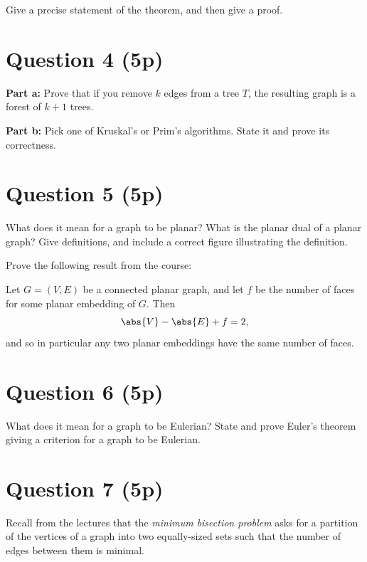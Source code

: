 \documentclass[nobib]{tufte-handout}
\begin{document}
Give a precise statement of the theorem, and then give a proof.

\section{Question 4 (5p)} %
\textbf{Part a:} Prove that if you remove $k$ edges from a tree $T$, the resulting graph is a forest of $k+1$ trees.
\vspace{0.5cm}

\noindent
\textbf{Part b:} Pick one of Kruskal's or Prim's algorithms. State it and prove its correctness.

\section{Question 5 (5p)} %

What does it mean for a graph to be planar? What is the planar dual of a planar graph? Give definitions, and include a correct figure illustrating the definition.

Prove the following result from the course:
\begin{theorem}
  Let $G = (V,E)$ be a connected planar graph, and let $f$ be the number of faces for some planar embedding of $G$. Then
  $$\abs{V} - \abs{E} + f = 2,$$
  and so in particular any two planar embeddings have the same number of faces.
\end{theorem}

\section{Question 6 (5p)} %
What does it mean for a graph to be Eulerian? State and prove Euler's theorem giving a criterion for a graph to be Eulerian.

\section{Question 7 (5p)} %

Recall from the lectures that the \emph{minimum bisection problem} asks for a partition of the vertices of a graph into two equally-sized sets such that the number of edges between them is minimal.
\end{document}
